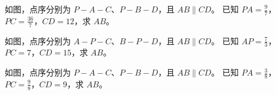 \documentclass{exam-zh}
\begin{document}

\begin{problem}[points=10]
  \noindent
  \begin{minipage}[t]{\dimexpr\linewidth-60mm-6mm\relax}
    \vspace{0pt}
    如图，点序分别为 $P-A-C$、$P-B-D$，且 $AB\parallel CD$。
已知 $PA=\frac{9}{7}$，$PC=\frac{36}{7}$，$CD=12$，求 $AB$。


  \end{minipage}\hfill
  \begin{diagramcoltikz}{60mm}{本题图}
  }
  \end{diagramcoltikz}
  \par\medskip
  \answerarea[38mm]
\end{problem}



\begin{problem}[points=10]
  \noindent
  \begin{minipage}[t]{\dimexpr\linewidth-60mm-6mm\relax}
    \vspace{0pt}
    如图，点序分别为 $A-P-C$、$B-P-D$，且 $AB\parallel CD$。
已知 $AP=\frac{7}{3}$，$PC=7$，$CD=15$，求 $AB$。


  \end{minipage}\hfill
  \begin{diagramcoltikz}{60mm}{本题图}
  }
  \end{diagramcoltikz}
  \par\medskip
  \answerarea[38mm]
\end{problem}



\begin{problem}[points=10]
  \noindent
  \begin{minipage}[t]{\dimexpr\linewidth-60mm-6mm\relax}
    \vspace{0pt}
    如图，点序分别为 $P-A-C$、$P-B-D$，且 $AB\parallel CD$。
已知 $PA=\frac{3}{8}$，$PC=\frac{9}{8}$，$CD=9$，求 $AB$。


  \end{minipage}\hfill
  \begin{diagramcoltikz}{60mm}{本题图}
  }
  \end{diagramcoltikz}
  \par\medskip
  \answerarea[38mm]
\end{problem}
\end{document}
